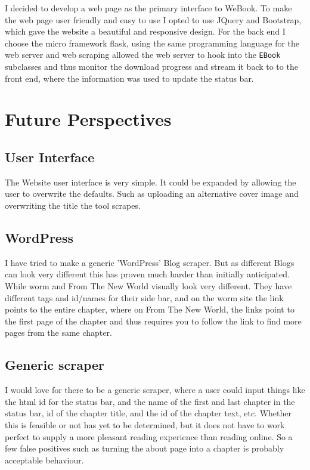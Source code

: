 \documentclass[]{report}   %
\begin{document}
I decided to develop a web page as the primary interface to WeBook. To make the
web page user friendly and easy to use I opted to use JQuery\cite{jquery}
and Bootstrap\cite{bootstrap}, which gave the website a beautiful and
responsive design. For the back end I choose the micro framework
flask\cite{flask}, using the same programming language for the web server and
web scraping allowed the web server to hook into the \texttt{EBook} subclasses
and thus monitor the download progress and stream it back to to the front end,
where the information was used to update the status bar.

\section{Future Perspectives}
\subsection{User Interface}
The Website user interface is very simple. It could be expanded by allowing the
user to overwrite the defaults. Such as uploading an alternative cover image
and overwriting the title the tool scrapes. 

\subsection{WordPress}
I have tried to make a generic 'WordPress' Blog scraper. But as different Blogs
can look very different this has proven much harder than initially anticipated.
While worm\cite{worm} and From The New World\cite{from_the_new_world} visually
look very different. They have different tags and id/names for their side bar,
and on the worm site the link points to the entire chapter, where on From The
New World, the links point to the first page of the chapter and thus requires
you to follow the link to find more pages from the same chapter.

\subsection{Generic scraper}
I would love for there to be a generic scraper, where a user could input things
like the html id for the status bar, and the name of the first and last chapter
in the status bar, id of the chapter title, and the id of the chapter text,
etc. Whether this is feasible or not has yet to be determined, but it does not
have to work perfect to supply a more pleasant reading experience than reading
online. So a few false positives such as turning the about page into a chapter
is probably acceptable behaviour. 
\end{document}
